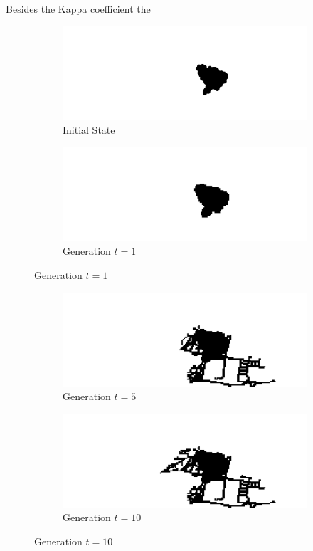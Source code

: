 Besides the Kappa coefficient the 
\begin{figure}[H]
\begin{subfigure}{.5\textwidth}
  \centering
  \includegraphics[width=1\linewidth]{Figures/Chapter4/generation-0-melusi}
  \caption*{Initial State}
\end{subfigure}
\begin{subfigure}{.5\textwidth}
  \centering
  \includegraphics[width=1\linewidth]{Figures/Chapter4/generation-1-melusi}
  \caption*{Generation $t = 1$}
\end{subfigure}
\end{figure}

\begin{figure}[H]
\begin{subfigure}{.5\textwidth}
  \centering
  \includegraphics[width=1\linewidth]{Figures/Chapter4/generation-5-melusi}
  \caption*{Generation $t = 5$}
\end{subfigure}
\begin{subfigure}{.5\textwidth}
  \centering
  \includegraphics[width=1\linewidth]{Figures/Chapter4/generation-10-melusi}
  \caption*{Generation $t = 10$}
\end{subfigure}
\end{figure}

